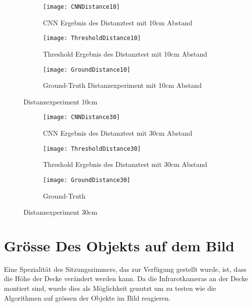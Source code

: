 \begin{figure}[H]
	\begin{subfigure}{.45\linewidth}
		\centering
		\texttt{[image: CNNDistance10]}
		\caption{\gls{CNN} Ergebnis des Distanztest mit 10cm Abstand}
		\label{fig:cnnDistance10}
	\end{subfigure}\hfill%
	\begin{subfigure}{.45\linewidth}
		\centering
		\texttt{[image: ThresholdDistance10]}
		\caption{Threshold Ergebnis des Distanztest mit 10cm Abstand}
		\label{fig:thresholdDistance10}
	\end{subfigure}
	\begin{subfigure}{\linewidth}
		\centering
		\texttt{[image: GroundDistance10]}
		\caption{Ground-Truth Distanzexperiment mit 10cm Abstand}
		\label{fig:groundDistance10}
	\end{subfigure}
	\caption{Distanzexperiment 10cm}
	\label{fig:Distance10}
\end{figure}

\begin{figure}[H]
	\begin{subfigure}{.45\linewidth}
		\centering
		\texttt{[image: CNNDistance30]}
		\caption{\gls{CNN} Ergebnis des Distanztest mit 30cm Abstand}
		\label{fig:cnnDistance30}
	\end{subfigure}\hfill%
	\begin{subfigure}{.45\linewidth}
		\centering
		\texttt{[image: ThresholdDistance30]}
		\caption{Threshold Ergebnis des Distanztest mit 30cm Abstand}
		\label{fig:thresholdDistance30}
	\end{subfigure}
	\begin{subfigure}{\linewidth}
		\centering
		\texttt{[image: GroundDistance30]}
		\caption{Ground-Truth}
		\label{fig:groundDistance30}
	\end{subfigure}
	\caption{Distanzexperiment 30cm}
	\label{fig:Distance30}
\end{figure}

\section{Grösse Des Objekts auf dem Bild}
\label{sec:objectSize}
Eine Spezialität des Sitzungszimmers, das zur Verfügung gestellt wurde, ist, dass die Höhe der Decke verändert werden kann. Da die Infrarotkameras an der Decke montiert sind, wurde dies als Möglichkeit genutzt um zu testen wie die Algorithmen auf grössen der Objekte im Bild reagieren. 

